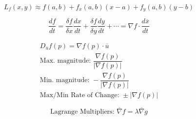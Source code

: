 \documentclass[12pt]{article}
\begin{document}
\vspace{-30pt}

\begin{multicols}{2}

  \begin{equation*}
    L_f(x,y)\approx f(a,b) + f_x(a,b)(x-a) + f_y(a,b)(y-b)
  \end{equation*}
    
  \begin{equation*}
    \dfrac{df}{dt}=\dfrac{\delta f}{\delta x}\dfrac{dx}{dt} + \dfrac{\delta f}{\delta y}\dfrac{dy}{dt} + \cdots = \nabla f\cdot\frac{d\overline{x}}{dt}
  \end{equation*}

\end{multicols}

\vspace{-30pt}

\begin{multicols}{2}

  \begin{equation*}
    \begin{split}
    D_{\overline{u}}f(p)=\nabla f(p)\cdot\overline{u}\\
    \text{Max. magnitude: } \dfrac{\nabla f(p)}{|\nabla f(p)|}\\
    \text{Min. magnitude: } -\dfrac{\nabla f(p)}{|\nabla f(p)|}\\
    \text{Max/Min Rate of Change: }\pm|\nabla f(p)|
  \end{split}
  \end{equation*}
    
  \begin{equation*}
    \text{Lagrange Multipliers: }\overline{\nabla}f=\lambda\overline{\nabla}g
  \end{equation*}

\end{multicols}

\vspace{-100pt}
\end{document}
